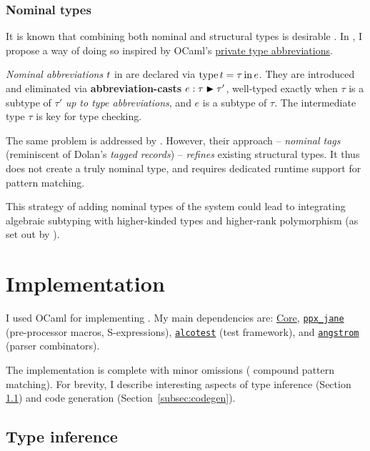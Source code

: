 \subsubsection{Nominal types} 
It is known that combining both nominal and structural types is desirable \cite{mlstruct, integrating-nominal-and-structural}. In \fabric{}, I propose a way of doing so inspired by OCaml's \href{https://ocaml.org/manual/5.1/privatetypes.html#ss:private-types-abbrev}{private type abbreviations}.

\emph{Nominal abbreviations} $t$ in \fabric{} are declared via $\mathrm{type}\,t=\tau\,\mathrm{in}\,e$. They are introduced and eliminated via \textbf{abbreviation-casts} ${e} : {\tau} \blacktriangleright {\tau'}$, well-typed exactly when $\tau$ is a subtype of $\tau'$ \emph{up to type abbreviations}, and $e$ is a subtype of $\tau$. The intermediate type $\tau$ is key for type checking.

The same problem is addressed by \textcite{mlstruct}. However, their approach -- \emph{nominal tags} (reminiscent of Dolan's \emph{tagged records}) -- \emph{refines} existing structural types. It thus does not create a truly nominal type, and requires dedicated runtime support for pattern matching.

This strategy of adding nominal types of the system could lead to integrating algebraic subtyping with higher-kinded types and higher-rank polymorphism (as set out by \textcite[Section~11.1]{dolan-thesis}). 

\section{Implementation}
\label{sec:fabric-impl}

I used OCaml for implementing \compiler{}. My main dependencies are: \href{https://opensource.janestreet.com/core/}{Core}, \href{https://github.com/janestreet/ppx_jane}{\texttt{ppx\_jane}} (pre-processor macros, S-expressions), \href{https://github.com/mirage/alcotest}{\texttt{alcotest}} (test framework), and \href{https://github.com/inhabitedtype/angstrom}{\texttt{angstrom}} (parser combinators).

The implementation is complete with minor omissions (\eg{} compound pattern matching). For brevity, I describe interesting aspects of type inference (Section \ref{subsec:type-inference-impl}) and code generation (Section~\ref{subsec:codegen}).

\subsection{Type inference} 
\label{subsec:type-inference-impl}


